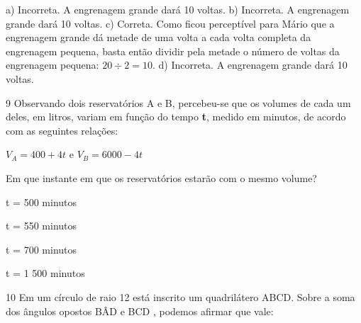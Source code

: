 {{{\begin{escolha}
{{{{\begin{escolha}
\begin{escolha}
{{a) Incorreta. A engrenagem grande dará 10 voltas.
b) Incorreta. A engrenagem grande dará 10 voltas.
c) Correta. Como ficou perceptível para Mário que a engrenagem grande dá metade de uma
volta a cada volta completa da engrenagem pequena, basta então dividir pela
metade o número de voltas da engrenagem pequena: $20 \div 2 = 10$.
d) Incorreta. A engrenagem grande dará 10 voltas.}

\num{9} Observando dois reservatórios A e B, percebeu-se que os volumes de 
cada um deles, em litros, variam em função do tempo \textbf{t}, medido em
minutos, de acordo com as seguintes relações:

$V_A = 400 + 4t$ e $V_B = 6000 - 4t$

Em que instante em que os reservatórios estarão com o mesmo volume?

\begin{escolha}

  \item t = 500 minutos

  \item t = 550 minutos

  \item t = 700 minutos

  \item t = 1 500 minutos

\end{escolha}


\num{10} Em um círculo de raio 12 está inscrito um quadrilátero ABCD.
Sobre a soma dos ângulos opostos BÂD e BCD %
, podemos afirmar que vale:

}
\end{escolha}
\end{escolha}}}}}
\end{escolha}}}}
